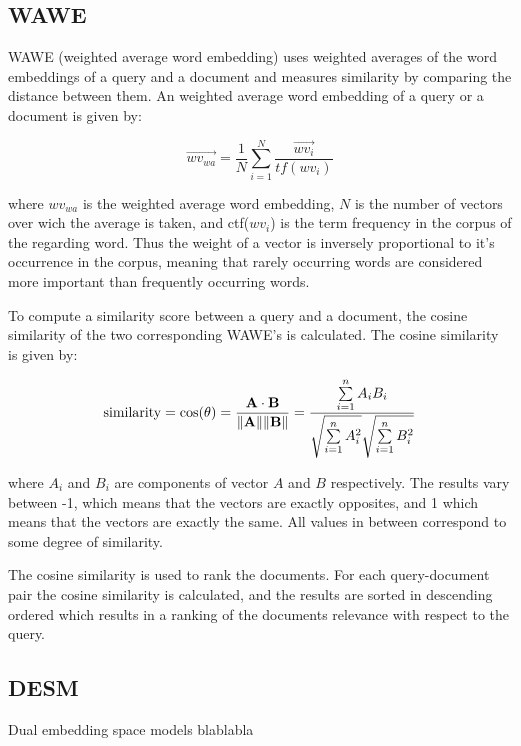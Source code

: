\documentclass{article}
\begin{document}
\subsection{WAWE}
WAWE (weighted average word embedding) uses weighted averages of the word embeddings of a query and a document and measures similarity by comparing the distance between them. An weighted average word embedding of a query or a document is given by:

$$\vec{wv_{wa}} = \frac{1}{N} \sum_{i=1}^{N} \frac{\vec{wv_i}}{tf(wv_i)}$$

where $wv_{wa}$ is the weighted average word embedding, $N$ is the number of vectors over wich the average is taken, and ctf($wv_i$) is the term frequency in the corpus of the regarding word. Thus the weight of a vector is inversely proportional to it's occurrence in the corpus, meaning that rarely occurring words are considered more important than frequently occurring words.

To compute a similarity score between a query and a document, the cosine similarity of the two corresponding WAWE's is calculated. The cosine similarity is given by:


$$\text{similarity} = \cos(\theta) = {\mathbf{A} \cdot \mathbf{B} \over \|\mathbf{A}\| \|\mathbf{B}\|} = \frac{ \sum\limits_{i=1}^{n}{A_i  B_i} }{ \sqrt{\sum\limits_{i=1}^{n}{A_i^2}}  \sqrt{\sum\limits_{i=1}^{n}{B_i^2}} }$$ 

where $A_i$ and $B_i$ are components of vector $A$ and $B$ respectively. The results vary between -1, which means that the vectors are exactly opposites, and 1 which means that the vectors are exactly the same. All values in between correspond to some degree of similarity.

The cosine similarity is used to rank the documents. For each query-document pair the cosine similarity is calculated, and the results are sorted in descending ordered which results in a ranking of the documents relevance with respect to the query.

\subsection{DESM}
Dual embedding space models blablabla
\end{document}
